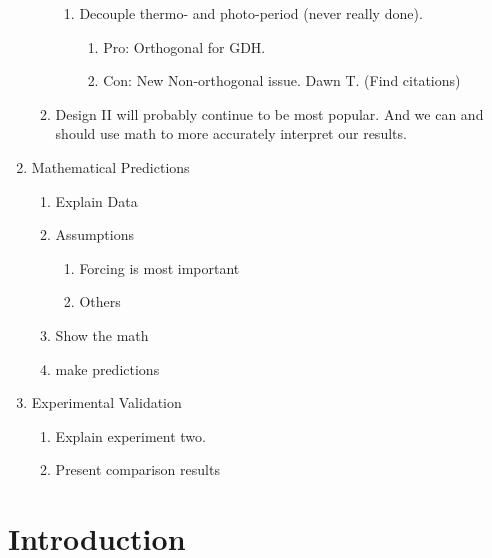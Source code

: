 \documentclass[12pt]{article}\usepackage[]{graphicx}\usepackage[]{color}
\begin{document}
\begin{enumerate}
\begin{enumerate}
\begin{enumerate}
            \item Decouple thermo- and photo-period (never really done).
            \begin{enumerate}
                \item Pro: Orthogonal for GDH.
                \item Con: New Non-orthogonal issue. Dawn T. (Find citations)
            \end{enumerate}
        \end{enumerate}
        \item Design II will probably continue to be most popular. And we can and should use math to more accurately interpret our results.
    \end{enumerate}
    \item Mathematical Predictions
    \begin{enumerate}
        \item Explain Data
        \item Assumptions
        \begin{enumerate}
            \item Forcing is most important
            \item Others
        \end{enumerate}
        \item Show the math
        \item make predictions
    \end{enumerate}
    \item Experimental Validation
    \begin{enumerate}
        \item Explain experiment two.
        \item Present comparison results
    \end{enumerate}
\end{enumerate}


\section*{Introduction}
\end{document}
